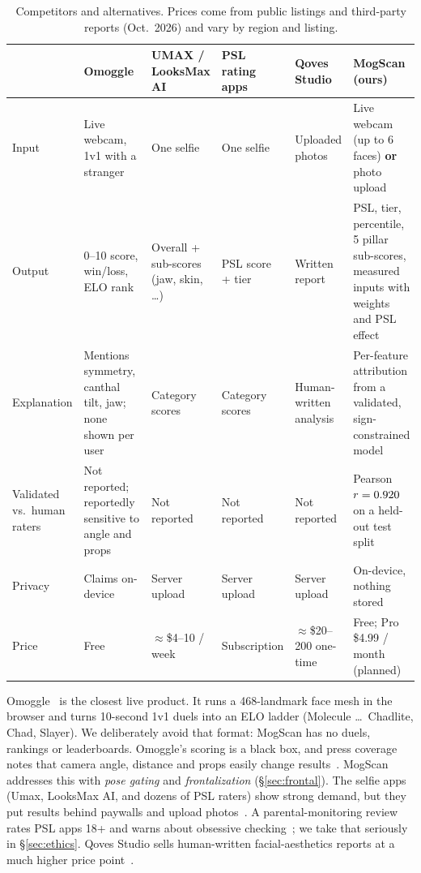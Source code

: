 \documentclass[sigconf,nonacm]{acmart}
\begin{document}
\begin{table}[t]
\caption{Competitors and alternatives. Prices come from public listings and third-party reports (Oct.\ 2026) and vary by region and listing.}
\label{tab:competitors}
\small
\begin{tabularx}{\textwidth}{@{}lXXXXX@{}}
\toprule
 & \textbf{Omoggle}~\cite{omoggle2026site,dexerto2026omoggle} & \textbf{UMAX / LooksMax AI}~\cite{plisio2026looksmax,hyscaler2026looksmax} & \textbf{PSL rating apps}~\cite{appstore2026looksmaxpsl,bark2026psl} & \textbf{Qoves Studio}~\cite{switchtools2026qoves} & \textbf{MogScan (ours)} \\
\midrule
Input & Live webcam, 1v1 with a stranger & One selfie & One selfie & Uploaded photos & Live webcam (up to 6 faces) \textbf{or} photo upload \\
Output & 0--10 score, win/loss, ELO rank & Overall + sub-scores (jaw, skin, \dots) & PSL score + tier & Written report & PSL, tier, percentile, 5 pillar sub-scores, \nFeatures{} measured inputs with weights and PSL effect \\
Explanation & Mentions symmetry, canthal tilt, jaw; none shown per user & Category scores & Category scores & Human-written analysis & Per-feature attribution from a validated, sign-constrained model \\
Validated vs.\ human raters & Not reported; reportedly sensitive to angle and props & Not reported & Not reported & Not reported & Pearson $r=0.920$ on a held-out test split \\
Privacy & Claims on-device & Server upload & Server upload & Server upload & On-device, nothing stored \\
Price & Free & $\approx$\$4--10 / week & Subscription & $\approx$\$20--200 one-time & Free; Pro \$4.99 / month (planned) \\
\bottomrule
\end{tabularx}
\end{table}

Omoggle~\cite{omoggle2026site} is the closest live product. It runs a
468-landmark face mesh in the browser and turns 10-second 1v1 duels into an ELO ladder
(Molecule \dots\ Chadlite, Chad, Slayer). We deliberately avoid that format: MogScan has no duels, rankings
or leaderboards. Omoggle's scoring is a black box, and press coverage notes that camera
angle, distance and props easily change results~\cite{dexerto2026omoggle}. MogScan addresses this with
\emph{pose gating} and \emph{frontalization} (\S\ref{sec:frontal}). The selfie apps (Umax, LooksMax AI,
and dozens of PSL raters) show strong demand, but they put results behind paywalls and upload
photos~\cite{plisio2026looksmax,hyscaler2026looksmax,appstore2026looksmaxpsl}. A parental-monitoring review
rates PSL apps 18+ and warns about obsessive checking~\cite{bark2026psl}; we take that seriously in
\S\ref{sec:ethics}. Qoves Studio sells human-written facial-aesthetics reports at a much higher price
point~\cite{switchtools2026qoves}.
\end{document}
